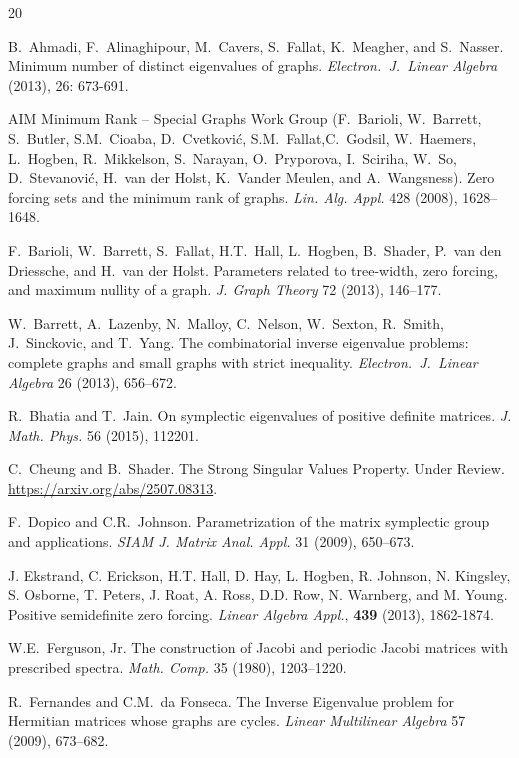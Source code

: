 \documentclass[12pt]{article}
\theoremstyle{definition}
\theoremstyle{definition}
\theoremstyle{definition}
\numberwithin{figure}{section}
\numberwithin{equation}{section}
\begin{document}
\begin{thebibliography}{20}

B.~Ahmadi, F.~Alinaghipour, M.~Cavers, S.~Fallat, K.~Meagher, and S.~Nasser. 
Minimum number of distinct eigenvalues of graphs. {\em Electron.~J.~Linear Algebra} (2013), 
26: 673-691.

 AIM Minimum Rank -- Special Graphs Work Group 
(F.~Barioli, W.~Barrett,  S.~Butler,   S.M.~Cioaba, D.~Cvetkovi\'c,  S.M.~Fallat,C.~Godsil,  W.~Haemers,  L.~Hogben,  R.~Mikkelson,  S.~Narayan, O.~Pryporova,   I.~Sciriha,  W.~So,   D.~Stevanovi\'c,  H.~van der Holst, K.~Vander Meulen, and A.~Wangsness).  Zero forcing sets and the minimum rank   of graphs.   {\em Lin. Alg. Appl.} 428 (2008), 
 1628--1648.

	F.~Barioli, W.~Barrett, S.~Fallat, H.T.~Hall, 
L.~Hogben, B.~Shader, P.~van den Driessche, and H.~van der Holst.  
Parameters related to tree-width, zero forcing, and maximum 
nullity of a graph.  {\em J. Graph Theory} 72 (2013),  146--177.

W.~Barrett,  A.~Lazenby, N.~Malloy, C.~Nelson, W.~Sexton, R.~Smith, J.~Sinckovic, and  T.~Yang. The combinatorial inverse eigenvalue problems: complete graphs and small graphs with strict inequality. {\em Electron.~J.~Linear Algebra} 26 (2013),   656--672.

R.~Bhatia and T.~Jain.
On symplectic eigenvalues of positive definite matrices.
{\it J. Math. Phys.} 56 (2015),  112201. 

 C.~Cheung and B.~Shader.
The Strong Singular Values Property. 
Under Review. \url{https://arxiv.org/abs/2507.08313}.


F.~Dopico and
    C.R.~Johnson.
Parametrization of the matrix symplectic group and applications. \emph{SIAM J. Matrix Anal. Appl.} 31
(2009), 650--673. 

 J. Ekstrand, C. Erickson, H.T. Hall, D. Hay, L. Hogben, R. Johnson, N. Kingsley, S. Osborne, T. Peters, J. Roat, A. Ross, D.D. Row, N. Warnberg, and M. Young.  Positive semidefinite zero forcing. {\it{Linear Algebra Appl.}}, {\bf{439}} (2013), 1862-1874.

	W.E.~Ferguson, Jr. The construction of Jacobi and periodic Jacobi matrices with prescribed spectra. {\em Math. Comp.} 35 (1980),  1203--1220.

	R.~Fernandes and C.M.~da Fonseca. The Inverse Eigenvalue problem for Hermitian matrices whose graphs are cycles.  {\em Linear Multilinear Algebra} 57 (2009),  673--682.


\end{thebibliography}
\end{document}
